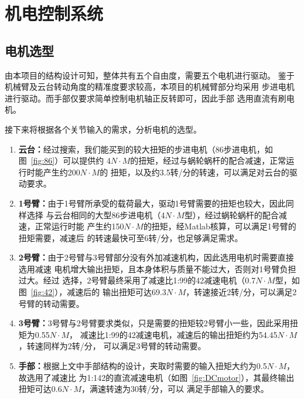 
\chapter{机电控制系统}

\section{电机选型}

由本项目的结构设计可知，整体共有五个自由度，需要五个电机进行驱动。
鉴于机械臂及云台转动角度的精准度要求较高，本项目的机械臂部分均采用
步进电机进行驱动。而手部仅要求简单控制电机轴正反转即可，因此手部
选用直流有刷电机。

接下来将根据各个关节输入的需求，分析电机的选型。
~\\

\begin{enumerate}
\item \textbf{云台：}经过搜索，我们能买到的较大扭矩的步进电机（86步进电机，如图~\ref{fig:86}）可以提供约
4$N\cdot M$的扭矩，经过与蜗轮蜗杆的配合减速，正常运行时能产生约200$N\cdot M$的
扭矩，以及约3.5转/分的转速，可以满足对云台的驱动要求。
\item \textbf{1号臂：}由于1号臂所承受的载荷最大，驱动1号臂需要的扭矩也较大，因此同样选择
与云台相同的大型86步进电机（4$N\cdot M$型），经过蜗轮蜗杆的配合减速，正常运行时能
产生约150$N\cdot M$的扭矩，经Matlab核算，可以满足1号臂的扭矩需要，减速后
的转速最快可至6转/分，也足够满足需求。
\item \textbf{2号臂：}由于2号臂与3号臂部分没有外加减速机构，因此选用电机时需要直接选用减速
电机增大输出扭矩，且本身体积与质量不能过大，否则对1号臂负担过大。经过
选择，2号臂最终采用了减速比1:99的42减速电机（0.7$N\cdot M$型，如图~\ref{fig:42}），减速后的
输出扭矩可达69.3$N\cdot M$，转速接近2转/分，可以满足2号臂的转动需要。
\item \textbf{3号臂：}3号臂与2号臂要求类似，只是需要的扭矩较2号臂小一些，因此采用扭矩为0.55$N\cdot M$，
减速比1:99的42减速电机，减速后的输出扭矩约为54.45$N\cdot M$，转速同样为2转/分，
可以满足3号臂的转动需要。
\item \textbf{手部：}根据上文中手部结构的设计，夹取时需要的输入扭矩大约为0.5$N\cdot M$，故选用了减速比
为1:142的直流减速电机（如图~\ref{fig:DCmotor}），其最终输出扭矩可达0.6$N\cdot M$，满速转速为30转/分，可以
满足手部输入的要求。
\end{enumerate}

